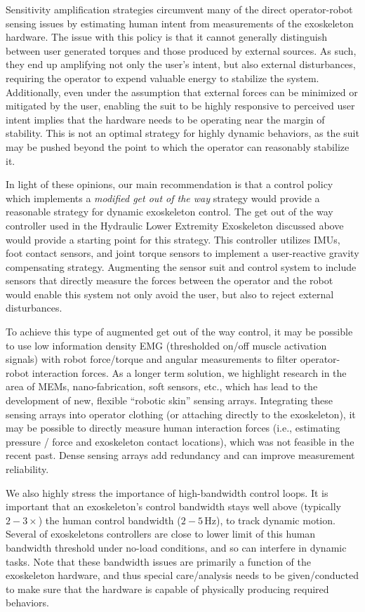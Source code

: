 \documentclass[letterpaper,12pt,fullpage]{article}
\begin{document}
Sensitivity amplification strategies circumvent many of the direct operator-robot sensing issues by estimating human intent from measurements of the exoskeleton hardware. The issue with this policy is that it cannot generally distinguish between user generated torques and those produced by external sources.  As such, they end up amplifying not only the user's intent, but also external disturbances, requiring the operator to expend valuable energy to stabilize the system.  Additionally, even under the assumption that external forces can be minimized or mitigated by the user, enabling the suit to be highly responsive to perceived user intent implies that the hardware needs to be operating near the margin of stability.  This is not an optimal strategy for highly dynamic behaviors, as the suit may be pushed beyond the point to which the operator can reasonably stabilize it.

In light of these opinions, our main recommendation is that a control policy which implements a \emph{modified get out of the way} strategy would provide a reasonable strategy for dynamic exoskeleton control.  The get out of the way controller used in the Hydraulic Lower Extremity Exoskeleton discussed above would provide a starting point for this strategy.  This controller utilizes IMUs, foot contact sensors, and joint torque sensors to implement a user-reactive gravity compensating strategy.  Augmenting the sensor suit and control system to include sensors that directly measure the forces between the operator and the robot would enable this system not only avoid the user, but also to reject external disturbances.

To achieve this type of augmented get out of the way control, it may be possible to use low information density EMG (thresholded on/off muscle activation signals) with robot force/torque and angular measurements to filter operator-robot interaction forces.  As a longer term solution, we highlight research in the area of MEMs, nano-fabrication, soft sensors, etc., which has lead to the development of new, flexible ``robotic skin'' sensing arrays.  Integrating these sensing arrays into operator clothing (or attaching directly to the exoskeleton), it may be possible to directly measure human interaction forces (i.e., estimating pressure / force and exoskeleton contact locations), which was not feasible in the recent past.  Dense sensing arrays add redundancy and can improve measurement reliability.  

We also highly stress the importance of high-bandwidth control loops.  It is important that an exoskeleton's control bandwidth stays well above (typically $2-3\times$) the human control bandwidth ($2-5\,$Hz), to track dynamic motion.  Several of exoskeletons controllers are close to lower limit of this human bandwidth threshold under no-load conditions, and so can interfere in dynamic tasks.  Note that these bandwidth issues are primarily a function of the exoskeleton hardware, and thus special care/analysis needs to be given/conducted to make sure that the hardware is capable of physically producing required behaviors. 
\end{document}
